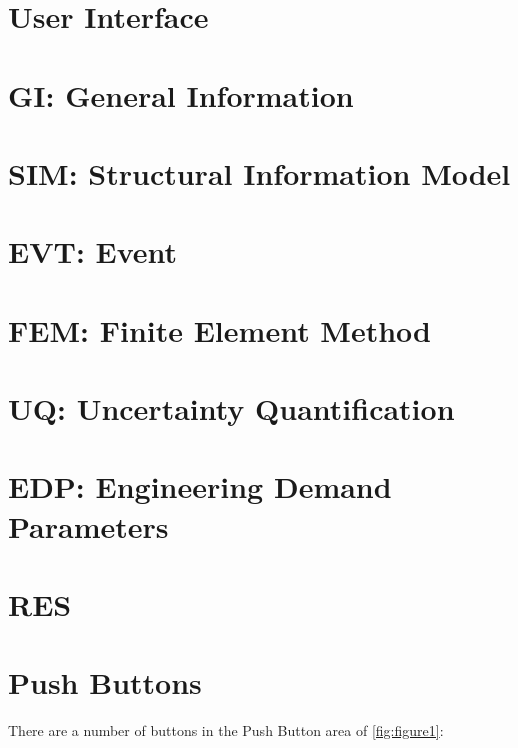 \section{User Interface}


\section{GI: General Information}


\section{SIM: Structural Information Model}


\section{EVT: Event}


\section{FEM: Finite Element Method}


\section{UQ: Uncertainty Quantification}


\section{EDP: Engineering Demand Parameters}


\section{RES}


\section{Push Buttons}
There are a number of buttons in the Push Button area of \autoref{fig:figure1}:
